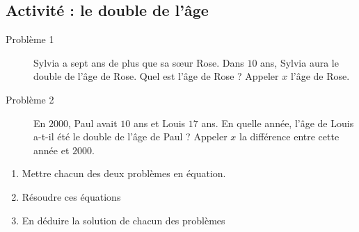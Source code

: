
\subsection*{Activité : le double de l'âge}

\begin{description}
    \item[Problème 1] Sylvia a sept ans de plus que sa sœur Rose. Dans $10$ ans, Sylvia aura le double de l'âge de Rose. Quel est l'âge de Rose ? Appeler $x$ l'âge de Rose.

    \item[Problème 2] En $2000$, Paul avait $10$ ans et Louis $17$ ans. En quelle année, l'âge de Louis a-t-il été le double de l'âge de Paul ? Appeler $x$ la différence entre cette année et $2000$.
\end{description}

\begin{enumerate}
    \item
        Mettre chacun des deux problèmes en équation.
    \item
        Résoudre ces équations
    \item
        En déduire la solution de chacun des problèmes
\end{enumerate}
